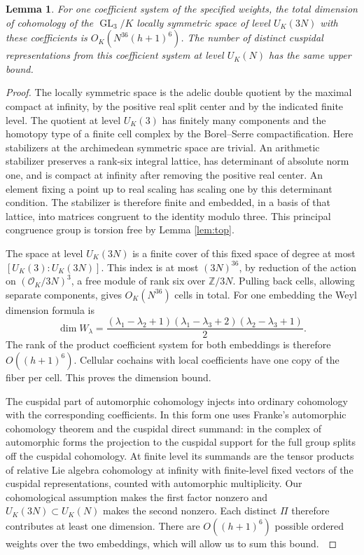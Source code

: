 \documentclass[a4paper,11pt]{article}
\newtheorem{lemma}[proposition]{Lemma}
\theoremstyle{definition}
\theoremstyle{remark}
\newcommand{\ZZ}{\mathbb Z}\newcommand{\ord}{\operatorname{ord}}
\numberwithin{equation}{section}
\newcommand{\GL}{\operatorname{GL}}
\newcommand{\OO}{\mathcal O}
\begin{document}
\begin{lemma}\label{lem:coh}
For one coefficient system of the specified weights, the total dimension of cohomology of the \(\GL_3/K\) locally symmetric space of level \(U_K(3N)\) with these coefficients is \(O_K(N^{36}(h+1)^6)\). The number of distinct cuspidal representations from this coefficient system at level \(U_K(N)\) has the same upper bound.
\end{lemma}
\begin{proof}
The locally symmetric space is the adelic double quotient by the maximal compact at infinity, by the positive real split center and by the indicated finite level. The quotient at level \(U_K(3)\) has finitely many components and the homotopy type of a finite cell complex by the Borel--Serre compactification. Here stabilizers at the archimedean symmetric space are trivial. An arithmetic stabilizer preserves a rank-six integral lattice, has determinant of absolute norm one, and is compact at infinity after removing the positive real center. An element fixing a point up to real scaling has scaling one by this determinant condition. The stabilizer is therefore finite and embedded, in a basis of that lattice, into matrices congruent to the identity modulo three. This principal congruence group is torsion free by Lemma \ref{lem:top}.~\cite{VI-IV-V-bs}

The space at level \(U_K(3N)\) is a finite cover of this fixed space of degree at most \([U_K(3):U_K(3N)]\). This index is at most \((3N)^{36}\), by reduction of the action on \((\OO_K/3N)^3\), a free module of rank six over \(\ZZ/3N\). Pulling back cells, allowing separate components, gives \(O_K(N^{36})\) cells in total. For one embedding the Weyl dimension formula is
\[
 \dim W_\lambda
  =\frac{(\lambda_1-\lambda_2+1)(\lambda_1-\lambda_3+2)
                             (\lambda_2-\lambda_3+1)}{2}.
\]
The rank of the product coefficient system for both embeddings is therefore \(O((h+1)^6)\). Cellular cochains with local coefficients have one copy of the fiber per cell. This proves the dimension bound.

The cuspidal part of automorphic cohomology injects into ordinary cohomology with the corresponding coefficients. In this form one uses Franke's automorphic cohomology theorem and the cuspidal direct summand: in the complex of automorphic forms the projection to the cuspidal support for the full group splits off the cuspidal cohomology. At finite level its summands are the tensor products of relative Lie algebra cohomology at infinity with finite-level fixed vectors of the cuspidal representations, counted with automorphic multiplicity. Our cohomological assumption makes the first factor nonzero and \(U_K(3N)\subset U_K(N)\) makes the second nonzero. Each distinct \(\Pi\) therefore contributes at least one dimension. There are \(O((h+1)^6)\) possible ordered weights over the two embeddings, which will allow us to sum this bound.~\cite{VI-IV-V-franke}
\end{proof}
\end{document}
